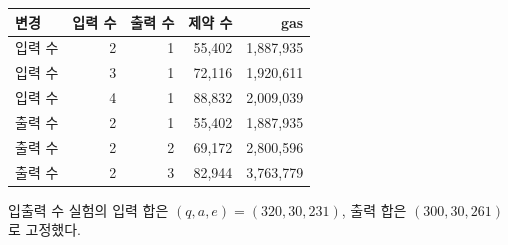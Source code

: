 \begin{center}
\begin{minipage}{\columnwidth}
\centering\small\captionsetup{hypcap=false}
\label{tab:eval-process}
\begin{tabular*}{\columnwidth}{@{\extracolsep{\fill}}lrrrr@{}}
\toprule
변경 & 입력 수 & 출력 수 & 제약 수 & gas \\ \midrule
입력 수 & 2 & 1 & 55,402 & 1,887,935 \\
입력 수 & 3 & 1 & 72,116 & 1,920,611 \\
입력 수 & 4 & 1 & 88,832 & 2,009,039 \\
출력 수 & 2 & 1 & 55,402 & 1,887,935 \\
출력 수 & 2 & 2 & 69,172 & 2,800,596 \\
출력 수 & 2 & 3 & 82,944 & 3,763,779 \\
\bottomrule
\end{tabular*}
\par\smallskip\begin{minipage}{\columnwidth}\footnotesize 입출력 수 실험의 입력 합은 $(q,a,e)=(320,30,231)$, 출력 합은 $(300,30,261)$로 고정했다.\end{minipage}
\end{minipage}
\end{center}
